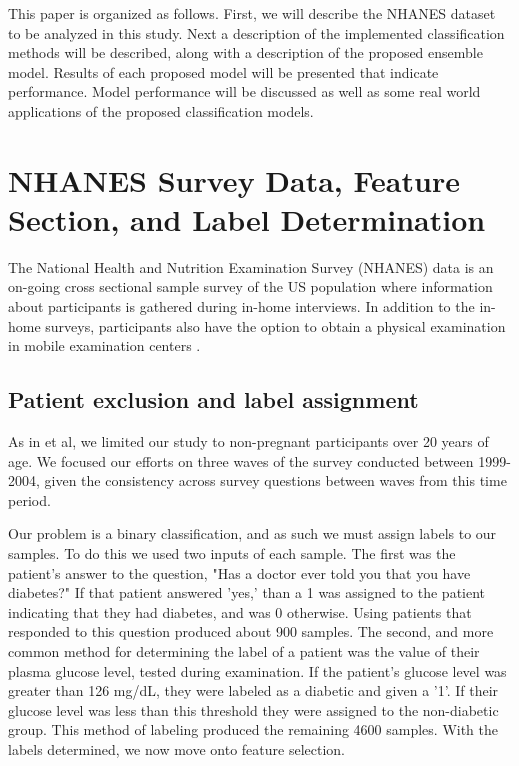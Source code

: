 \documentclass{article} %
\begin{document}
This paper is organized as follows. First, we will describe the NHANES dataset to be analyzed in this study. Next a description of the implemented classification methods will be described, along with a description of the proposed ensemble model. Results of each proposed model will be presented that indicate performance. Model performance will be discussed as well as some real world applications of the proposed classification models. 

\section{NHANES Survey Data, Feature Section, and Label Determination}
The National Health and Nutrition Examination Survey (NHANES) data is an on-going cross sectional sample survey of the US population where information about participants is gathered during in-home interviews. In addition to the in-home surveys, participants also have the option to obtain a physical examination in mobile examination centers \cite{center_for_disease_and_control_national_????}.

\subsection{Patient exclusion and label assignment}
As in \cite{yu_application_2010} et al, we limited our study to non-pregnant participants over 20 years of age. We focused our efforts on three waves of the survey conducted between 1999-2004, given the consistency across survey questions between waves from this time period.

Our problem is a binary classification, and as such we must assign labels to our samples. To do this we used two inputs of each sample. The first was the patient's answer to the question, "Has a doctor ever told you that you have diabetes?" If that patient answered 'yes,' than a 1 was assigned to the patient indicating that they had diabetes, and was 0 otherwise. Using patients that responded to this question produced about 900 samples. The second, and more common method for determining the label of a patient was the value of their plasma glucose level, tested during examination. If the patient's glucose level was greater than 126 mg/dL, they were labeled as a diabetic and given a '1'. If their glucose level was less than this threshold they were assigned to the non-diabetic group. This method of labeling produced the remaining 4600 samples. With the labels determined, we now move onto feature selection. 
\end{document}
